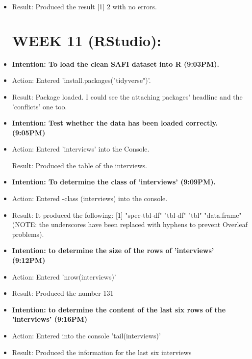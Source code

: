 \documentclass[a4paper,12pt]{article}
\begin{document}
\begin{itemize}
\item Result: Produced the result [1] 2 with no errors. 


\section{WEEK 11 (RStudio):}

\item \textbf{Intention: To load the clean SAFI dataset into R (9:03PM).}


\item Action: Entered 'install.packages("tidyverse")'. 


\item Result: Package loaded. I could see the attaching packages' headline and the 'conflicts' one too.


\item \textbf{Intention: Test whether the data has been loaded correctly. (9:05PM)}


\item Action: Entered 'interviews' into the Console.


\result Result: Produced the table of the interviews.


\item \textbf{Intention: To determine the class of 'interviews' (9:09PM).}


\item Action: Entered -class (interviews) into the console. 

\item Result: It produced the following: [1] "spec-tbl-df" "tbl-df"      "tbl"         "data.frame" (NOTE: the underscores have been replaced with hyphens to prevent Overleaf problems).


\item \textbf{Intention: to determine the size of the rows of 'interviews' (9:12PM)}


\item Action: Entered 'nrow(interviews)'


\item Result: Produced the number 131


\item \textbf{Intention: to determine the content of the last six rows of the 'interviews' (9:16PM)}


\item Action: Entered into the console 'tail(interviews)'

\item Result: Produced the information for the last six interviews 


\end{itemize}
\end{document}

